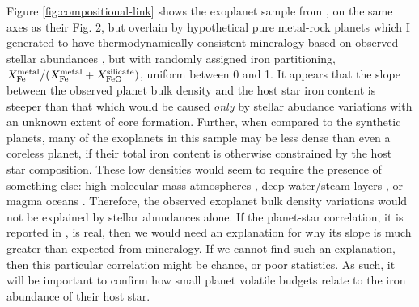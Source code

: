 



Figure \ref{fig:compositional-link} shows the exoplanet sample from \citet{adibekyan_compositional_2021}, on the same axes as their Fig. 2, but overlain by hypothetical pure metal-rock planets which I generated to have thermodynamically-consistent mineralogy based on observed stellar abundances \citep{hinkel_stellar_2014}, but with randomly assigned iron partitioning, $X_{\ce{Fe}}^{\rm metal}/(X_{\ce{Fe}}^{\rm metal} + X_{\ce{FeO}}^{\rm silicate})$, uniform between 0 and 1. It appears that the slope between the observed planet bulk density and the host star iron content is steeper than that which would be caused \textit{only} by stellar abudance variations with an unknown extent of core formation. Further, when compared to the synthetic planets, many of the exoplanets in this sample may be less dense than even a coreless planet, if their total iron content is otherwise constrained by the host star composition. These low densities would seem to require the presence of something else: high-molecular-mass atmospheres \citep{schulze_probability_2020}, deep water/steam layers \citep{kite_water_2021}, or magma oceans \citep{bower_linking_2019}. Therefore, the observed exoplanet bulk density variations would not be explained by stellar abundances alone. If the planet-star correlation, it is reported in \citet{adibekyan_compositional_2021}, is real, then we would need an explanation for why its slope is much greater than expected from mineralogy. If we cannot find such an explanation, then this particular correlation might be chance, or poor statistics. As such, it will be important to confirm how small planet volatile budgets relate to the iron abundance of their host star. %

